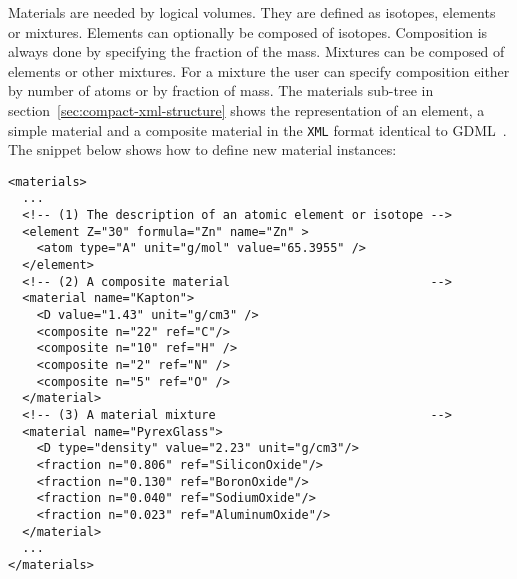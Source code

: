 Materials are needed by logical volumes. They are defined as isotopes,  elements or mixtures. Elements can optionally be composed of isotopes. Composition is always done by specifying the fraction of the mass. Mixtures can be composed of elements or other mixtures. For a mixture the user can specify composition either by number of atoms or by fraction of mass. The materials sub-tree in section~\ref{sec:compact-xml-structure} shows the representation of an element, a simple material and a  composite material in the \texttt{XML} format identical to GDML~\cite{Chytracek:2006be}. The snippet below shows how to define new material instances:
\begin{verbatim}
<materials>
  ...
  <!-- (1) The description of an atomic element or isotope -->
  <element Z="30" formula="Zn" name="Zn" >
    <atom type="A" unit="g/mol" value="65.3955" />
  </element>
  <!-- (2) A composite material                            -->
  <material name="Kapton">
    <D value="1.43" unit="g/cm3" />
    <composite n="22" ref="C"/>
    <composite n="10" ref="H" />
    <composite n="2" ref="N" />
    <composite n="5" ref="O" />
  </material>
  <!-- (3) A material mixture                              -->
  <material name="PyrexGlass">
    <D type="density" value="2.23" unit="g/cm3"/>
    <fraction n="0.806" ref="SiliconOxide"/>
    <fraction n="0.130" ref="BoronOxide"/>
    <fraction n="0.040" ref="SodiumOxide"/>
    <fraction n="0.023" ref="AluminumOxide"/>
  </material>
  ...
</materials>
\end{verbatim}


